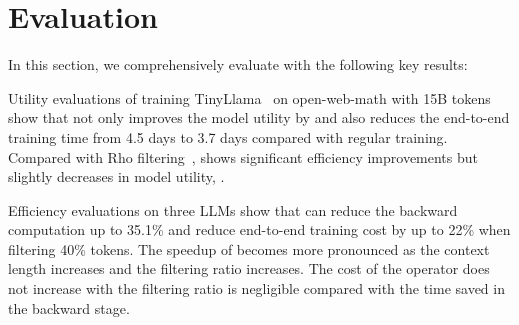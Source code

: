 \section{Evaluation} \label{sec:evaluation}

In this section, we comprehensively evaluate \solution with the following key results:

\begin{icompact}
    \item Utility evaluations of training TinyLlama~\cite{tinyllama} on open-web-math with 15B tokens~\cite{DBLP:conf/iclr/PasterSAB24} show that \solution not only improves the model utility by  and also reduces the end-to-end training time from 4.5 days to 3.7 days compared with regular training. Compared with Rho filtering~\cite{RHO}, \solution shows significant efficiency improvements but slightly decreases in model utility, .
    \item Efficiency evaluations on three LLMs show that \solution can reduce the backward computation up to 35.1\% and reduce end-to-end training cost by up to 22\% when filtering 40\% tokens. The speedup of \solution becomes more pronounced as the context length increases and the filtering ratio increases. The cost of the \solution operator does not increase with the filtering ratio is negligible compared with the time saved in the backward stage.
\end{icompact}

